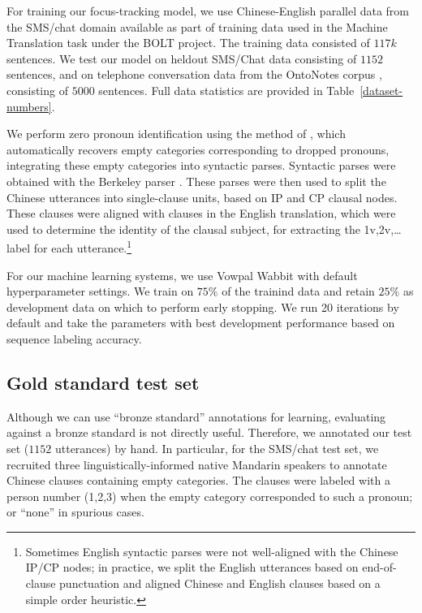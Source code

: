 \documentclass[11pt]{report}
\begin{document}
For training our focus-tracking model, we use Chinese-English parallel data from the SMS/chat domain available as part of training data used in the Machine Translation task under the BOLT project. The training data consisted of $117k$ sentences. We test our model on heldout SMS/Chat data consisting of $1152$ sentences, and on telephone conversation data from the OntoNotes corpus \cite{hovy2006ontonotes}, consisting of $5000$ sentences. Full data statistics are provided in Table~\ref{dataset-numbers}.

We perform zero pronoun identification using the method of \cite{cai2011language}, which automatically recovers empty categories corresponding to dropped pronouns, integrating these empty categories into syntactic parses. Syntactic parses were obtained with the Berkeley parser \cite{petrov2007improved}. These parses were then used to split the Chinese utterances into single-clause units, based on IP and CP clausal nodes. These clauses were aligned with clauses in the English translation, which were used to determine the identity of the clausal subject, for extracting the 1v,2v,\dots label for each utterance.\footnote{Sometimes English syntactic parses were not well-aligned with the Chinese IP/CP nodes; in practice, we split the English utterances based on end-of-clause punctuation and aligned Chinese and English clauses based on a simple order heuristic.}

For our machine learning systems, we use Vowpal Wabbit \cite{langford2007vowpal} with default hyperparameter settings. We train on $75\%$ of the trainind data and retain $25\%$ as development data on which to perform early stopping. We run 20 iterations by default and take the parameters with best development performance based on sequence labeling accuracy.

\subsection{Gold standard test set} \label{gold}

Although we can use ``bronze standard'' annotations for learning, evaluating against a bronze standard is not directly useful. Therefore, we annotated our test set ($1152$ utterances) by hand. In particular, for the SMS/chat test set, we recruited three linguistically-informed native Mandarin speakers to annotate Chinese clauses containing empty categories. The clauses were labeled with a person number (1,2,3) when the empty category corresponded to such a pronoun; or ``none'' in spurious cases.
\end{document}
